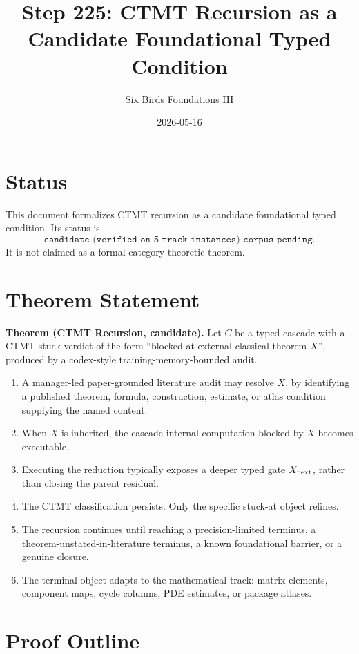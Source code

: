 \documentclass{article}
\title{Step 225: CTMT Recursion as a Candidate Foundational Typed Condition}
\author{Six Birds Foundations III}
\date{2026-05-16}
\begin{document}
\maketitle

\section{Status}

This document formalizes CTMT recursion as a candidate foundational typed condition. Its status is
\[
\texttt{candidate (verified-on-5-track-instances) corpus-pending}.
\]
It is not claimed as a formal category-theoretic theorem.

\section{Theorem Statement}

\textbf{Theorem (CTMT Recursion, candidate).}
Let \(C\) be a typed cascade with a CTMT-stuck verdict of the form ``blocked at external classical theorem \(X\)'', produced by a codex-style training-memory-bounded audit.

\begin{enumerate}
\item A manager-led paper-grounded literature audit may resolve \(X\), by identifying a published theorem, formula, construction, estimate, or atlas condition supplying the named content.
\item When \(X\) is inherited, the cascade-internal computation blocked by \(X\) becomes executable.
\item Executing the reduction typically exposes a deeper typed gate \(X_{\rm next}\), rather than closing the parent residual.
\item The CTMT classification persists. Only the specific stuck-at object refines.
\item The recursion continues until reaching a precision-limited terminus, a theorem-unstated-in-literature terminus, a known foundational barrier, or a genuine closure.
\item The terminal object adapts to the mathematical track: matrix elements, component maps, cycle columns, PDE estimates, or package atlases.
\end{enumerate}

\section{Proof Outline}
\end{document}
